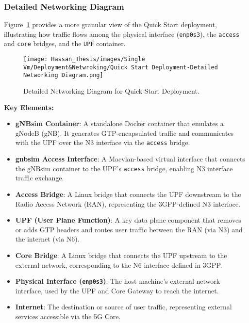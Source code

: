 \subsubsection{Detailed Networking Diagram}
\label{subsubsec:qs-detailed-network}

Figure~\ref{fig:quick-start-networking} provides a more granular view of the Quick Start deployment, illustrating how traffic flows among the physical interface (\texttt{enp0s3}), the \texttt{access} and \texttt{core} bridges, and the \texttt{UPF} container.

\begin{figure}[H]
    \centering
    \texttt{[image: Hassan\_Thesis/images/Single Vm/Deployment\&Netwroking/Quick Start Deployment-Detailed Networking Diagram.png]}
    \caption{Detailed Networking Diagram for Quick Start Deployment.}
    \label{fig:quick-start-networking}
\end{figure}

\textbf{Key Elements:}
\begin{itemize}
    \item \textbf{gNBsim Container}: A standalone Docker container that emulates a gNodeB (gNB). It generates GTP-encapsulated traffic and communicates with the UPF over the N3 interface via the \texttt{access} bridge.
    
    \item \textbf{gnbsim Access Interface}: A Macvlan-based virtual interface that connects the gNBsim container to the UPF's \texttt{access} bridge, enabling N3 interface traffic exchange.

    \item \textbf{Access Bridge}: A Linux bridge that connects the UPF downstream to the Radio Access Network (RAN), representing the 3GPP-defined N3 interface.

    \item \textbf{UPF (User Plane Function)}: A key data plane component that removes or adds GTP headers and routes user traffic between the RAN (via N3) and the internet (via N6).

    \item \textbf{Core Bridge}: A Linux bridge that connects the UPF upstream to the external network, corresponding to the N6 interface defined in 3GPP.

    \item \textbf{Physical Interface (\texttt{enp0s3})}: The host machine’s external network interface, used by the UPF and Core Gateway to reach the internet.

    \item \textbf{Internet}: The destination or source of user traffic, representing external services accessible via the 5G Core.
\end{itemize}


